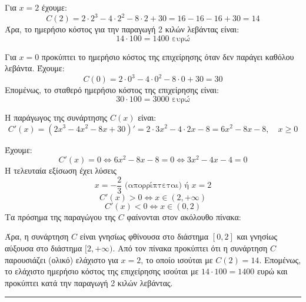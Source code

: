\begin{alist}
\item Για $x = 2$ έχουμε:
\[ C(2) = 2 \cdot 2^3 - 4 \cdot 2^2 - 8 \cdot 2 + 30 = 16 - 16 - 16 + 30 = 14 \]
Άρα, το ημερήσιο κόστος για την παραγωγή 2 κιλών λεβάντας είναι:
\[ 14 \cdot 100 = 1400 \text{ ευρώ} \]
\item Για $x = 0$ προκύπτει το ημερήσιο κόστος της επιχείρησης όταν δεν παράγει καθόλου λεβάντα. Έχουμε:
\[ C(0) = 2 \cdot 0^3 - 4 \cdot 0^2 - 8 \cdot 0 + 30 = 30 \]
Επομένως, το σταθερό ημερήσιο κόστος της επιχείρησης είναι:
\[ 30 \cdot 100 = 3000 \text{ ευρώ} \]

\item Η παράγωγος της συνάρτησης $C(x)$ είναι:
\[ C'(x) = (2x^3 - 4x^2 - 8x + 30)' = 2 \cdot 3x^2 - 4 \cdot 2x - 8 = 6x^2 - 8x - 8, \quad x \geq 0 \]

\item Έχουμε:
\[ C'(x) = 0 \Leftrightarrow 6x^2 - 8x - 8 = 0 \Leftrightarrow 3x^2 - 4x - 4 = 0 \]
Η τελευταία εξίσωση έχει λύσεις
\[ x = -\frac{2}{3} \text{ (απορρίπτεται) ή } x = 2 \]
\[ C'(x) > 0 \Leftrightarrow x \in (2, +\infty) \]
\[ C'(x) < 0 \Leftrightarrow x \in (0,2) \]
Τα πρόσημα της παραγώγου της $C$ φαίνονται στον ακόλουθο πίνακα:
\begin{center}
\end{center}
Άρα, η συνάρτηση $C$ είναι γνησίως φθίνουσα στο διάστημα $[0,2]$ και γνησίως αύξουσα στο διάστημα $[2, +\infty).$
Από τον πίνακα προκύπτει ότι η συνάρτηση $C$ παρουσιάζει (ολικό) ελάχιστο για $x = 2$, το οποίο ισούται με $C(2) = 14$. Επομένως, το ελάχιστο ημερήσιο κόστος της επιχείρησης ισούται με $14 \cdot 100 = 1400$ ευρώ και προκύπτει κατά την παραγωγή 2 κιλών λεβάντας.
\end{alist}
\vspace{6mm}
\noindent\rule{\textwidth}{0.4pt}
\vspace{6mm}


